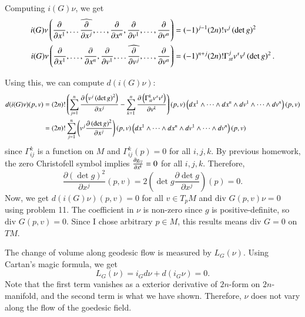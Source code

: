 \documentclass[a4paper, 12pt]{article}
\theoremstyle{Mydefinition}
\theoremstyle{Mytheorem}
\begin{document}
\begin{enumerate}
\begin{equation}
    \end{equation}
    Computing $i(G)\nu$, we get
    \begin{equation}
    \begin{split}
        i(G)\nu\left(\pdv{x^1}, \ldots \widehat{\pdv{x^j}}, \ldots, \pdv{x^n}, \pdv{v^1}, \ldots, \pdv{v^n}\right) &= (-1)^{j-1}(2n)! v^j\left(\det g\right)^2\\
        i(G)\nu\left(\pdv{x^1}, \ldots , \pdv{x^n}, \pdv{v^1}, \ldots \widehat{\pdv{v^j}}, \ldots, \pdv{v^n}\right) &= (-1)^{n+j}(2n)!\Gamma_{st}^j v^sv^t\left(\det g\right)^2.
    \end{split}
    \end{equation}
    
    Using this, we can compute $d(i(G)\nu)$:
    \begin{equation}
        \begin{split}
            d(i(G)\nu)(p,v) &= (2n)!\left(\sum_{j=1}^n \pdv{\left(v^j\left(\det g\right)^2\right)}{x^j} - \sum_{k=1}^n \pdv{\left(\Gamma_{st}^k v^sv^t\right)}{v^k} \right)(p,v)\left(dx^1\wedge \cdots \wedge dx^n\wedge dv^1 \wedge \cdots \wedge dv^n\right)(p,v)\\
            &=(2n)!\sum_{j=1}^n \left(v^j\frac{\partial\left(\det g\right)^2}{\partial x^j}\right)(p,v)\left(dx^1\wedge \cdots \wedge dx^n\wedge dv^1 \wedge \cdots \wedge dv^n\right)(p,v)
        \end{split}
    \end{equation}
    since $\Gamma_{ij}^k$ is a function on $M$ and $\Gamma_{ij}^k(p) = 0$ for all $i,j,k$. By previous homework, the zero Christofell symbol implies $\pdv{g_{ij}}{x^k}(p) = 0$ for all $i,j,k$. Therefore,
    \begin{equation}
        \frac{\partial\left(\det g\right)^2}{\partial x^j}(p,v) = 2\left(\det g\frac{\partial\det g}{\partial x^j}\right)(p) = 0.
    \end{equation}
    Now, we get $d(i(G)\nu)(p,v) = 0$ for all $v\in T_pM$ and $\textrm{div }G(p,v)\nu = 0$ using problem 11. The coefficient in $\nu$ is non-zero since $g$ is positive-definite, so $\textrm{div }G(p,v) = 0$. Since I chose arbitrary $p\in M$, this results means $\textrm{div } G = 0$ on $TM$.
    
    The change of volume along geodesic flow is measured by $L_G(\nu)$. Using Cartan's magic formula, we get
    \begin{equation}
        L_G(\nu) = i_G d\nu + d(i_G\nu) = 0.
    \end{equation}
    Note that the first term vanishes as a exterior derivative of $2n$-form on $2n$-manifold, and the second term is what we have shown. Therefore, $\nu$ does not vary along the flow of the goedesic field.
    

\end{enumerate}
\end{document}
